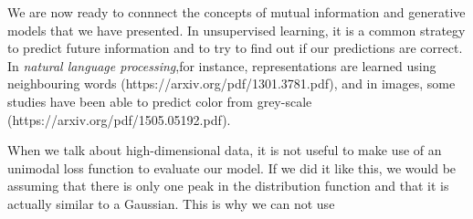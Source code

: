 We are now ready to connnect the concepts of mutual information and generative models that we have presented. In unsupervised learning,
it is a common strategy to predict future information and to try to find out if our predictions are correct.
In \emph{natural language processing},for instance, representations are learned 
using neighbouring words (https://arxiv.org/pdf/1301.3781.pdf), and in images, some studies have been able to predict color from grey-scale (https://arxiv.org/pdf/1505.05192.pdf).

When we talk about high-dimensional data, it is not useful to make use of an unimodal loss function to evaluate our model. If we did it like this, we would be assuming that there is only
one peak in the distribution function and that it is actually similar to a Gaussian. This is why we can not use